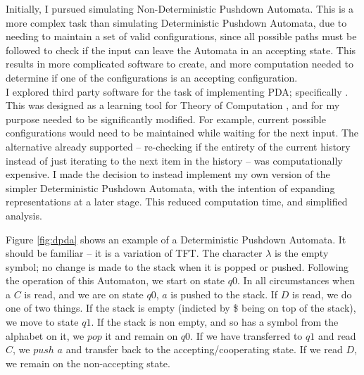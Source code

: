 \documentclass[a4paper,11pt,bcshonoursthesis,singlespace,oneside,thesisdraft,pdflatex]{cssethesis}
\begin{document}
Initially, I pursued simulating Non-Deterministic Pushdown Automata. 
This is a more complex task than simulating Deterministic Pushdown Automata, due to needing to maintain a set of valid configurations, since all possible paths must be followed to check if the input can leave the Automata in an accepting state. 
This results in more complicated software to create, and more computation needed to determine if one of the configurations is an accepting configuration. \\

I explored third party software for the task of implementing PDA; specifically \citet{JFLAP}. 
This was designed as a learning tool for Theory of Computation \citep{rodger2009increasing}, and for my purpose needed to be significantly modified. For example, current possible configurations would need to be maintained while waiting for the next input. The alternative already supported -- re-checking if the entirety of the current history instead of just iterating to the next item in the history -- was computationally expensive.  I made the decision to instead implement my own version of the simpler Deterministic Pushdown Automata, with the intention of expanding representations at a later stage. 
This reduced computation time, and simplified analysis. 

Figure \ref{fig:dpda} shows an example of a Deterministic Pushdown Automata. 
It should be familiar -- it is a variation of TFT. 
The character $\lambda$ is the empty symbol; no change is made to the stack when it is popped or pushed. Following the operation of this Automaton, we start on state $q0$. In all circumstances when a $C$ is read, and we are on state $q0$, $a$ is pushed to the stack. 
If $D$ is read, we do one of two things. If the stack is empty (indicted by \$ being on top of the stack), we move to state $q1$. 
If the stack is non empty, and so has a symbol from the alphabet on it, we $pop$ it and remain on $q0$. 
If we have transferred to $q1$ and read $C$, we $push$ $a$ and transfer back to the accepting/cooperating state. 
If we read $D$, we remain on the non-accepting state.
\end{document}

